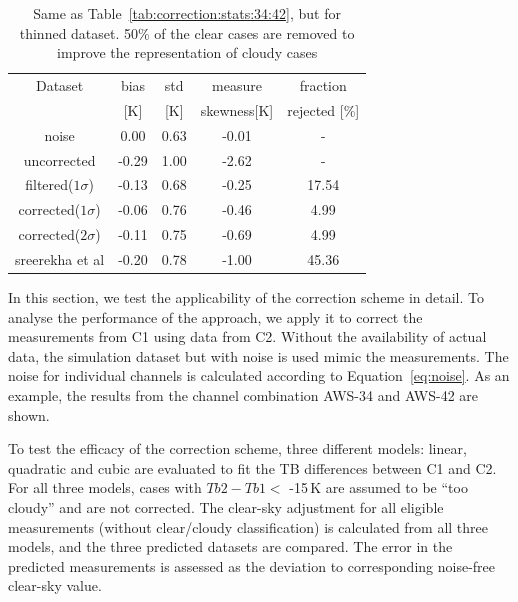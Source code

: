 \documentclass[12pt]{article}
\begin{document}
\begin{table}[!bt]
	\centering
	\begin{tabular}[b]{c|c|c|c|c}
		Dataset  		  &   bias &   std &   measure  & fraction  \\
		&   [K]  &   [K] & skewness[K] & rejected [\%]\\
		\hline
	noise             		&   0.00 &  0.63 &              -0.01 &                - \\
	uncorrected       		&  -0.29 &  1.00 &              -2.62 &                - \\
	filtered($1\sigma$)  	&  -0.13 &  0.68 &              -0.25 &               17.54 \\
	corrected($1\sigma$) 	&  -0.06 &  0.76 &              -0.46 &                4.99 \\
	corrected($2\sigma$) 	&  -0.11 &  0.75 &              -0.69 &                4.99 \\
	sreerekha et al   		&  -0.20 &  0.78 &              -1.00 &               45.36 \\	
		\hline
\end{tabular}
\caption{Same as Table~\ref{tab:correction:stats:34:42}, but for thinned dataset. 50\% of the clear cases are removed to improve the representation of cloudy cases }
\label{tab:correction:stats:34:42:thinned}
\end{table}
%
In this section, we test the applicability of the correction scheme in detail. To analyse the performance of the approach, we apply it to correct the measurements from C1 using data from C2. Without the availability of actual data, the simulation dataset but with noise is used mimic the measurements. The noise for individual channels is calculated according to Equation~\ref{eq:noise}. As an example, the results from the channel combination AWS-34 and AWS-42 are shown.

To test the efficacy of the correction scheme, three different models: linear,
quadratic and cubic are evaluated to fit the TB differences between C1 and C2.
For all three models, cases with $Tb2-Tb1 < $ -15\,K are assumed to be ``too
cloudy'' and are not corrected. The clear-sky adjustment for all eligible
measurements (without clear/cloudy classification) is calculated from all three
models, and the three predicted datasets are compared. The error in the
predicted measurements is assessed as the deviation to corresponding noise-free
clear-sky value.
\end{document}
